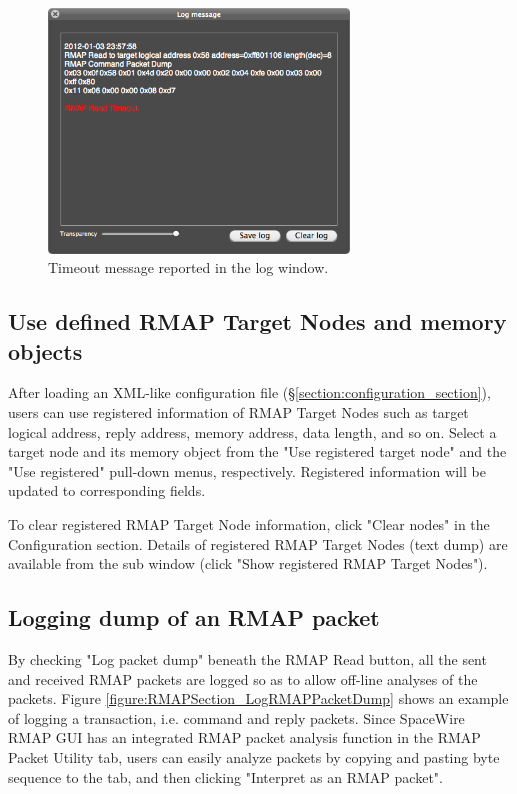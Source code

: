 \documentclass[a4paper,10pt]{article}
\begin{document}
\begin{figure}[htb]
\begin{center}
\includegraphics[width=8cm]{figures/SpaceWireRMAPGUI/RMAPSection_ReadTimeout.png}
\vspace{-2mm}
\caption{Timeout message reported in the log window.}
\label{figure:RMAPSection_ReadTimeout}
\end{center}
\end{figure}


\subsection{Use defined RMAP Target Nodes and memory objects}
After loading an XML-like configuration file (\S\ref{section:configuration_section}), users can use registered information of RMAP Target Nodes such as target logical address, reply address, memory address, data length, and so on.
Select a target node and its memory object from the "Use registered target node" and the "Use registered" pull-down menus, respectively. Registered information will be updated to corresponding fields.

To clear registered RMAP Target Node information, click "Clear nodes" in the Configuration section. Details of registered RMAP Target Nodes (text dump) are available from the sub window (click "Show registered RMAP Target Nodes").

\subsection{Logging dump of an RMAP packet}
By checking "Log packet dump" beneath the RMAP Read button, all the sent and received RMAP packets are logged so as to allow off-line analyses of the packets. Figure \ref{figure:RMAPSection_LogRMAPPacketDump} shows an example of logging a transaction, i.e. command and reply packets. Since SpaceWire RMAP GUI has an integrated RMAP packet analysis function in the RMAP Packet Utility tab, users can easily analyze packets by copying and pasting byte sequence to the tab, and then clicking "Interpret as an RMAP packet".
\end{document}
